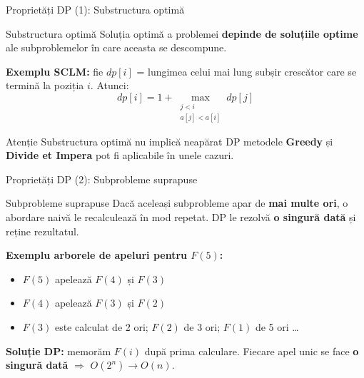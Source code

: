 \documentclass{beamer}
\begin{document}
\begin{frame}{Proprietăți DP (1): Substructura optimă}
  \begin{block}{Substructura optimă}
    Soluția optimă a problemei \textbf{depinde de soluțiile optime}
    ale subproblemelor în care aceasta se descompune.
  \end{block}
  \smallskip
  \textbf{Exemplu \textemdash{} SCLM:} fie $dp[i]$ = lungimea celui mai lung
  subșir crescător care se termină la poziția $i$. Atunci:
  \[
    dp[i] = 1 + \max_{\substack{j < i \\ a[j] < a[i]}} dp[j]
  \]
  \begin{alertblock}{Atenție}
    Substructura optimă nu implică neapărat DP \textemdash{} metodele
    \textbf{Greedy} și \textbf{Divide et Impera} pot fi aplicabile în unele cazuri.
  \end{alertblock}
\end{frame}

\begin{frame}{Proprietăți DP (2): Subprobleme suprapuse}
  \begin{block}{Subprobleme suprapuse}
    Dacă aceleași subprobleme apar de \textbf{mai multe ori},
    o abordare naivă le recalculează în mod repetat.
    DP le rezolvă \textbf{o singură dată} și reține rezultatul.
  \end{block}
  \smallskip
  \textbf{Exemplu \textemdash{} arborele de apeluri pentru $F(5)$:}
  \begin{itemize}\itemsep2pt
    \item $F(5)$ apelează $F(4)$ și \alert{$F(3)$}
    \item $F(4)$ apelează \alert{$F(3)$} și $F(2)$
    \item \alert{$F(3)$} este calculat de \alert{2 ori}; $F(2)$ de 3 ori; $F(1)$ de 5 ori \ldots
  \end{itemize}
  \smallskip
  \textbf{Soluție DP:} memorăm $F(i)$ după prima calculare.
  Fiecare apel unic se face \textbf{o singură dată}
  $\Rightarrow$ $O(2^n) \rightarrow O(n)$.
\end{frame}
\end{document}
